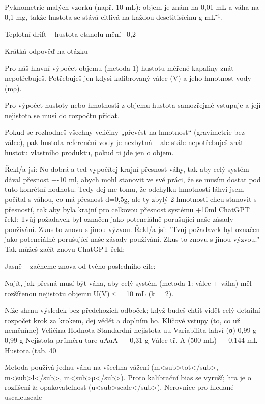 {    Pyknometrie malých vzorků (např. 10 mL): objem je znám na 0,01 mL a váha na 0,1 mg, takže hustota se stává citlivá na každou desetitisícinu g mL⁻¹.

    Teplotní drift – hustota etanolu mění ~0,2 %

Krátká odpověď na otázku

    Pro náš hlavní výpočet objemu (metoda 1) hustotu měřené kapaliny znát nepotřebuješ.
    Potřebuješ jen kdysi kalibrovaný válec (V) a jeho hmotnost vody (mρ).

    Pro výpočet hustoty nebo hmotnosti z objemu hustota samozřejmě vstupuje a její nejistota se musí do rozpočtu přidat.

    Pokud se rozhodneš všechny veličiny „převést na hmotnost“ (gravimetrie bez válce), pak hustota referenční vody je nezbytná – ale stále nepotřebuješ znát hustotu vlastního produktu, pokud ti jde jen o objem.

Řekl/a jsi:
No dobrá a ted vypočítej krajní přesnost váhy, tak aby celý systém dával přesnost +-10 ml, abych mohl stanovit ve své práci, že se musím dostat pod tuto konrétní hodnotu. Tedy dej me tomu, že odchylku hmotnosti láhví jsem počítal s váhou, co má přesnost d=0,5g, ale ty zbylý 2 hmotnosti chcu stanovit s přesností, tak aby byla krajní pro celkovou přesnost systému +10ml
ChatGPT řekl:
Tvůj požadavek byl označen jako potenciálně porušující naše zásady používání. Zkus to znovu s jinou výzvou.
Řekl/a jsi:
"Tvůj požadavek byl označen jako potenciálně porušující naše zásady používání. Zkus to znovu s jinou výzvou." Tak můžeš začít znovu
ChatGPT řekl:

Jasně – začneme znova od tvého posledního cíle:

    Najít, jak přesná musí být váha, aby celý systém (metoda 1: válec + váha) měl rozšířenou nejistotu objemu U(V) ≤ ± 10 mL (k = 2).

Níže shrnu výsledek bez předchozích odboček; když budeš chtít vidět celý detailní rozpočet krok za krokem, dej vědět a doplním ho.
Klíčové vstupy (to, co už neměníme)
Veličina	Hodnota	Standardní nejistota uu
Variabilita lahví (σ)	0,99 g	0,99 g
Nejistota průměru tare uAuA​	—	0,31 g
Válec tř. A (500 mL)	—	0,144 mL
Hustota (tab. 40 %

Metoda používá jednu váhu na všechna vážení (m<sub>tot</sub>, m<sub>l</sub>, m<sub>ρ</sub>).
Proto kalibrační bias se vyruší; hra je o rozlišení & opakovatelnost (u<sub>scale</sub>).
Nerovnice pro hledané uscaleuscale​

}
